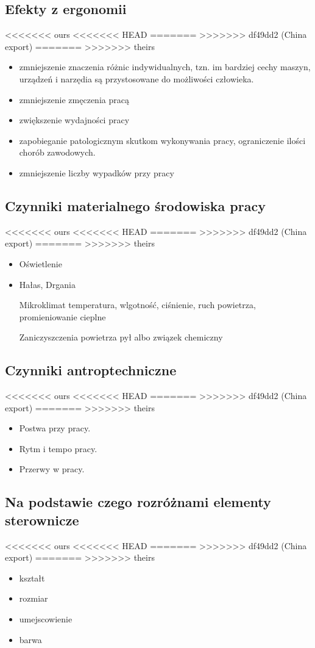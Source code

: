 \documentclass[11pt]{article}
\begin{document}
\begin{enumerate}
\begin{enumerate}
\subsection{Efekty z ergonomii}
<<<<<<< ours
<<<<<<< HEAD
\label{sec:org0b72d5b}
=======
\label{sec:org8ba4d18}
>>>>>>> df49dd2 (China export)
=======
\label{sec:org8ba4d18}
>>>>>>> theirs
\begin{itemize}
\item zmniejszenie znaczenia różnic indywidualnych, tzn. im bardziej cechy maszyn, urządzeń i narzędia są przystosowane do możliwości człowieka.
\item zmniejszenie zmęczenia pracą
\item zwiększenie wydajności pracy
\item zapobieganie patologicznym skutkom wykonywania pracy, ograniczenie ilości chorób zawodowych.
\item zmniejszenie liczby wypadków przy pracy
\end{itemize}
\subsection{Czynniki materialnego środowiska pracy}
<<<<<<< ours
<<<<<<< HEAD
\label{sec:org5ec75dd}
=======
\label{sec:org4d31d24}
>>>>>>> df49dd2 (China export)
=======
\label{sec:org4d31d24}
>>>>>>> theirs
\begin{itemize}
\item Oświetlenie
\item Hałas, Drgania
\item[{Mikroklimat}] temperatura, wlgotność, ciśnienie, ruch powietrza, promieniowanie cieplne
\item[{Zaniczyszczenia powietrza}] pył albo związek chemiczny
\end{itemize}
\subsection{Czynniki antroptechniczne}
<<<<<<< ours
<<<<<<< HEAD
\label{sec:org13c3584}
=======
\label{sec:org63a829f}
>>>>>>> df49dd2 (China export)
=======
\label{sec:org63a829f}
>>>>>>> theirs
\begin{itemize}
\item Postwa przy pracy.
\item Rytm i tempo pracy.
\item Przerwy w pracy.
\end{itemize}
\subsection{Na podstawie czego rozróżnami elementy sterownicze}
<<<<<<< ours
<<<<<<< HEAD
\label{sec:org28b94e2}
=======
\label{sec:org6875725}
>>>>>>> df49dd2 (China export)
=======
\label{sec:org6875725}
>>>>>>> theirs
\begin{itemize}
\item kształt
\item rozmiar
\item umejscowienie
\item barwa
\end{itemize}

\end{enumerate}
\end{enumerate}
\end{document}
